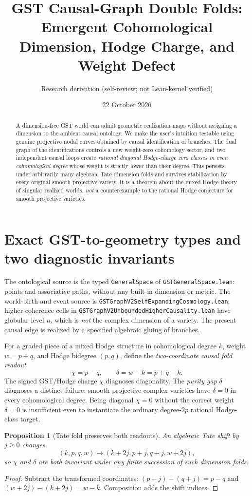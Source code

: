 \documentclass[11pt]{article}
\title{GST Causal-Graph Double Folds: Emergent Cohomological Dimension,
Hodge Charge, and Weight Defect}
\author{Research derivation (self-review; not Lean-kernel verified)}
\date{22 October 2026}
\newtheorem{proposition}{Proposition}
\begin{document}
\maketitle

\begin{abstract}
A dimension-free GST world can admit geometric realization maps without
assigning a dimension to the ambient causal ontology.  We make the user's
intuition testable using genuine projective nodal curves obtained by causal
identification of branches.  The dual graph of the identifications controls
a new weight-zero cohomology sector, and two independent causal loops create
\emph{rational diagonal Hodge-charge zero classes in even cohomological degree}
whose weight is strictly lower than their degree.  This persists under
arbitrarily many algebraic Tate dimension folds and survives stabilization
by every original smooth projective variety.  It is a theorem about the
mixed Hodge theory of singular realized worlds, \emph{not} a counterexample
to the rational Hodge conjecture for smooth projective varieties.
\end{abstract}

\section{Exact GST-to-geometry types and two diagnostic invariants}
The ontological source is the typed \texttt{GeneralSpace} of
\texttt{GSTGeneralSpace.lean}: points and associative paths, without
any built-in dimension or metric. The world-birth and event source is
\texttt{GSTGraphV2SelfExpandingCosmology.lean}; higher coherence cells in
\texttt{GSTGraphV2UnboundedHigherCausality.lean} have globular level $n$,
which is \emph{not} the complex dimension of a variety. The present
causal edge is realized by a specified algebraic gluing of branches.

For a graded piece of a mixed Hodge structure in cohomological degree
$k$, weight $w=p+q$, and Hodge bidegree $(p,q)$, define the
\emph{two-coordinate causal fold readout}
\[
  \chi=p-q,\qquad \delta=w-k=p+q-k.
\]
The signed GST/Hodge charge $\chi$ diagnoses diagonality.
The \emph{purity gap} $\delta$ diagnoses a distinct failure:
smooth projective complex varieties have $\delta=0$ in every
cohomological degree. Being diagonal $\chi=0$ without the correct
weight $\delta=0$ is insufficient even to instantiate the ordinary
degree-$2p$ rational Hodge-class target.

\begin{proposition}[Tate fold preserves both readouts]
An algebraic Tate shift by $j\geq0$ changes
\[
(k,p,q,w)\longmapsto(k+2j,p+j,q+j,w+2j),
\]
so $\chi$ and $\delta$ are both invariant under any finite succession
of such dimension folds.
\end{proposition}
\begin{proof}
Subtract the transformed coordinates:
$(p+j)-(q+j)=p-q$ and $(w+2j)-(k+2j)=w-k$.
Composition adds the shift indices.
\end{proof}
\end{document}
